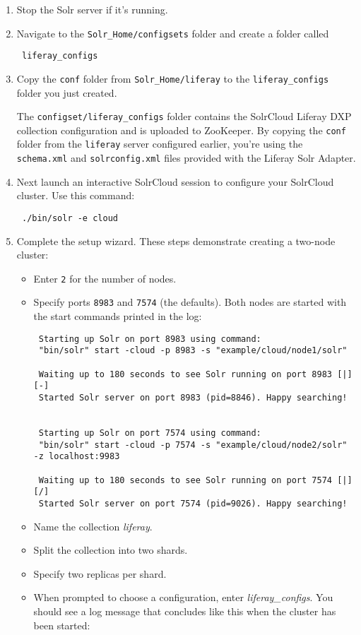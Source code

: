 \begin{enumerate}
\def\labelenumi{\arabic{enumi}.}
\item
  Stop the Solr server if it's running.
\item
  Navigate to the \texttt{Solr\_Home/configsets} folder and create a
  folder called

\begin{verbatim}
 liferay_configs
\end{verbatim}
\item
  Copy the \texttt{conf} folder from \texttt{Solr\_Home/liferay} to the
  \texttt{liferay\_configs} folder you just created.

  The \texttt{configset/liferay\_configs} folder contains the SolrCloud
  Liferay DXP collection configuration and is uploaded to ZooKeeper. By
  copying the \texttt{conf} folder from the \texttt{liferay} server
  configured earlier, you're using the \texttt{schema.xml} and
  \texttt{solrconfig.xml} files provided with the Liferay Solr Adapter.
\item
  Next launch an interactive SolrCloud session to configure your
  SolrCloud cluster. Use this command:

\begin{verbatim}
 ./bin/solr -e cloud
\end{verbatim}
\item
  Complete the setup wizard. These steps demonstrate creating a two-node
  cluster:

  \begin{itemize}
  \item
    Enter \texttt{2} for the number of nodes.
  \item
    Specify ports \texttt{8983} and \texttt{7574} (the defaults). Both
    nodes are started with the start commands printed in the log:

\begin{verbatim}
 Starting up Solr on port 8983 using command:
 "bin/solr" start -cloud -p 8983 -s "example/cloud/node1/solr"

 Waiting up to 180 seconds to see Solr running on port 8983 [|]  [-]  
 Started Solr server on port 8983 (pid=8846). Happy searching!


 Starting up Solr on port 7574 using command:
 "bin/solr" start -cloud -p 7574 -s "example/cloud/node2/solr" -z localhost:9983

 Waiting up to 180 seconds to see Solr running on port 7574 [|]  [/]  
 Started Solr server on port 7574 (pid=9026). Happy searching!
\end{verbatim}
  \item
    Name the collection \emph{liferay}.
  \item
    Split the collection into two shards.
  \item
    Specify two replicas per shard.
  \item
    When prompted to choose a configuration, enter
    \emph{liferay\_configs}. You should see a log message that concludes
    like this when the cluster has been started:
  \end{itemize}


\end{enumerate}
